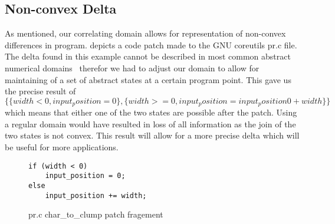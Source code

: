 \subsection{Non-convex Delta}
As mentioned, our correlating domain allows for representation of non-convex differences in program.  depicts a code patch made to the GNU coreutils pr.c file. The delta found in this example cannot be described in most common abstract numerical domains~\cite{Octagon,Donut} therefor we had to adjust our domain to allow for maintaining of a set of abstract states at a certain program point. This gave us the precise result of $\{\{width < 0, input_position = 0\}, \{width >= 0, input_position = input_position0 + width\}\}$ which means that either one of the two states are possible after the patch. Using a regular domain would have resulted in loss of all information as the join of the two states is not convex. This result will allow for a more precise delta which will be useful for more applications.

\begin{figure}[ht]
\centering
\begin{lstlisting}
if (width < 0)
    input_position = 0;
else
    input_position += width;
\end{lstlisting}
\caption{pr.c char\_to\_clump patch fragement}
\end{figure}


